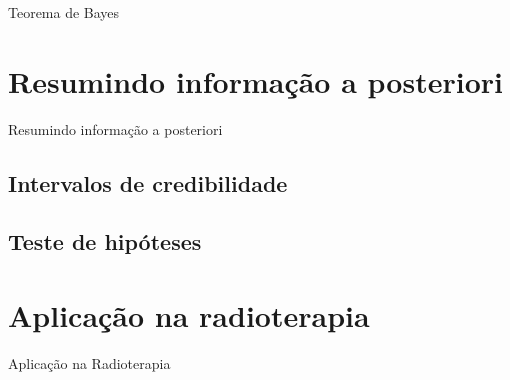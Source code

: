 \documentclass{beamer}
\begin{document}
\begin{frame}{Teorema de Bayes}
      
\end{frame}

\section{Resumindo informação a posteriori}

\begin{frame}{Resumindo informação a posteriori}
\subsection{Intervalos de credibilidade}

\subsection{Teste de hipóteses}
    
\end{frame}

\section{Aplicação na radioterapia}

\begin{frame}{Aplicação na Radioterapia}
    
\end{frame}
 
\end{document}
